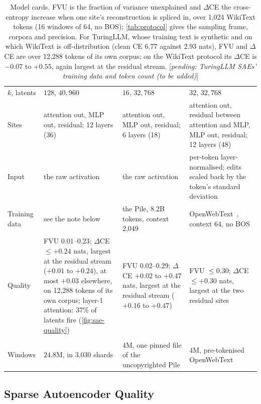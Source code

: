 \documentclass[10pt]{article}
\newif\ifexternal
\DeclareRobustCommand{\pending}[1]{%
  \ifexternal
    \ifvmode\textcolor{black!55}{[to be added]}\else\unskip\fi
  \else
    \textcolor{red!70!black}{[\textit{pending: #1}]}%
  \fi}
\begin{document}
\begin{table}[!ht]
\begin{tabularx}{\linewidth}{@{}>{\raggedright\arraybackslash}p{2.0cm}>{\raggedright\arraybackslash}X>{\raggedright\arraybackslash}X>{\raggedright\arraybackslash}X@{}}
$k$, latents & $128$, $40{,}960$ & $16$, $32{,}768$ & $32$, $32{,}768$ \\
Sites & attention out, MLP out, residual; 12 layers (36) & attention out, MLP out, residual; 6 layers (18) & attention out, residual between attention and MLP, MLP out, residual; 12 layers (48) \\
Input & the raw activation & the raw activation & per-token layer-normalised; edits scaled back by the token's standard deviation \\
Training data & see the note below & the Pile, 8.2B tokens, context 2{,}049 & OpenWebText~\citep{gokaslan2019openwebtext}, context 64, no BOS \\
Quality & FVU $0.01$--$0.23$; $\Delta$CE $\leq +0.24$ nats, largest at the residual stream ($+0.01$ to $+0.24$), at most $+0.03$ elsewhere, on 12{,}288 tokens of its own corpus; layer-1 attention: 37\% of latents fire (\cref{fig:sae-quality}) & FVU $0.02$--$0.29$; $\Delta$CE $+0.02$ to $+0.47$ nats, largest at the residual stream ($+0.16$ to $+0.47$) & FVU $\leq 0.30$; $\Delta$CE $\leq +0.30$ nats, largest at the two residual sites \\
\midrule
\multicolumn{4}{@{}l}{\emph{Analysis corpus (64-token windows, no BOS for the public models)}} \\
Windows & $24.8$M, in 3{,}030 shards & $4$M, one pinned file of the uncopyrighted Pile & $4$M, pre-tokenised OpenWebText \\
\bottomrule
\end{tabularx}
\caption{Model cards. FVU is the fraction of variance unexplained and $\Delta$CE the cross-entropy increase when one site's reconstruction is spliced in, over 1{,}024 WikiText tokens (16 windows of 64, no BOS); \cref{tab:protocol} gives the sampling frame, corpora and precision. For TuringLLM, whose training text is synthetic and on which WikiText is off-distribution (clean CE $6.77$ against $2.93$ nats), FVU and $\Delta$CE are over 12{,}288 tokens of its own corpus; on the WikiText protocol its $\Delta$CE is $-0.07$ to $+0.55$, again largest at the residual stream. \pending{TuringLLM SAEs' training data and token count (to be added)}}
\label{tab:model-cards}
\end{table}

\subsection{Sparse Autoencoder Quality}
\label{app:sae-quality}
\end{document}

